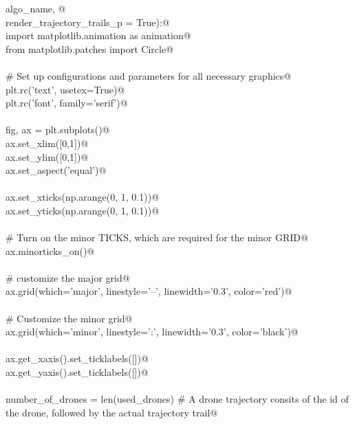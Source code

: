 \documentclass[10.0pt]{report}
\begin{document}
\begin{appendices}
\begin{flushleft}
\begin{list}{}{}
\mbox{}\verb@                 algo_name,  @\\
\mbox{}\verb@                 render_trajectory_trails_p = True):@\\
\mbox{}\verb@    import matplotlib.animation as animation@\\
\mbox{}\verb@    from   matplotlib.patches import Circle@\\
\mbox{}\verb@@\\
\mbox{}\verb@    # Set up configurations and parameters for all necessary graphics@\\
\mbox{}\verb@    plt.rc('text', usetex=True)@\\
\mbox{}\verb@    plt.rc('font', family='serif')@\\
\mbox{}\verb@@\\
\mbox{}\verb@    fig, ax = plt.subplots()@\\
\mbox{}\verb@    ax.set_xlim([0,1])@\\
\mbox{}\verb@    ax.set_ylim([0,1])@\\
\mbox{}\verb@    ax.set_aspect('equal')@\\
\mbox{}\verb@@\\
\mbox{}\verb@    ax.set_xticks(np.arange(0, 1, 0.1))@\\
\mbox{}\verb@    ax.set_yticks(np.arange(0, 1, 0.1))@\\
\mbox{}\verb@@\\
\mbox{}\verb@    # Turn on the minor TICKS, which are required for the minor GRID@\\
\mbox{}\verb@    ax.minorticks_on()@\\
\mbox{}\verb@@\\
\mbox{}\verb@    # customize the major grid@\\
\mbox{}\verb@    ax.grid(which='major', linestyle='--', linewidth='0.3', color='red')@\\
\mbox{}\verb@@\\
\mbox{}\verb@    # Customize the minor grid@\\
\mbox{}\verb@    ax.grid(which='minor', linestyle=':', linewidth='0.3', color='black')@\\
\mbox{}\verb@@\\
\mbox{}\verb@    ax.get_xaxis().set_ticklabels([])@\\
\mbox{}\verb@    ax.get_yaxis().set_ticklabels([])@\\
\mbox{}\verb@@\\
\mbox{}\verb@    number_of_drones   = len(used_drones) # A drone trajectory consits of the id of the drone, followed by the actual trajectory trail@\\

\end{list}
\end{flushleft}
\end{appendices}
\end{document}

